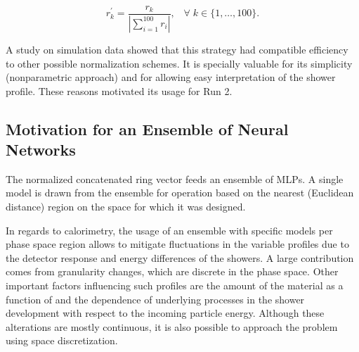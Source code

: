 \begin{equation}
  r^\prime_{k} = \frac{r_{k}}{| \sum\limits_{i=1}^{100} r_i
  |}, \;\;\;
    \forall \; k\in\{1,\dots,100\}.
\label{eq:ring_norm}
\end{equation}

A study on simulation data showed that this strategy had compatible
efficiency to other possible normalization schemes. It is specially valuable for its
simplicity (nonparametric approach) and for allowing easy interpretation of the
shower profile. These reasons motivated its usage for Run 2.

\subsection{Motivation for an Ensemble of Neural Networks}\label{top:nn_ensemble}

The normalized concatenated ring vector feeds an ensemble of MLPs. A single
model is drawn from the ensemble for operation based on the nearest (Euclidean
distance) region on the \eteta space for which it was designed.

In regards to calorimetry, the usage of an ensemble with specific models per
phase space region allows to mitigate fluctuations in the variable profiles
due to the detector response and energy differences of the showers.
A large contribution comes from granularity changes, which are discrete
in the phase space. Other important factors 
influencing such profiles are the
amount of the material as a function of \abseta{} and the dependence of
underlying processes in the shower development with respect to the incoming
particle energy. Although these alterations are mostly continuous, it is also
possible to approach the problem using space discretization.


